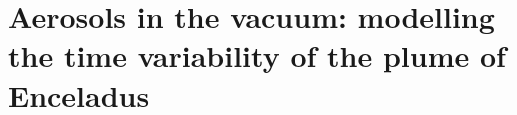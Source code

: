 \documentclass[draft]{agujournal2019}
\begin{document}
%


%
%
%
%

\chapter{Aerosols in the vacuum: modelling the time variability of the plume of Enceladus}
\end{document}
